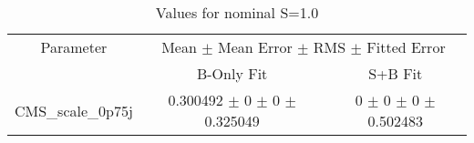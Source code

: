 \begin{table}
\centering
\caption{Values for nominal S=1.0}
\begin{tabular}{ccc}
\toprule
Parameter 	& \multicolumn{2}{c}{Mean $\pm$ Mean Error $\pm$ RMS $\pm$ Fitted Error}\\
 	& B-Only Fit & S+B Fit\\
\midrule
CMS\_scale\_0p75j 	& \num{0.300492} $\pm$ \num{0} $\pm$ \num{0} $\pm$ \num{0.325049} 	& \num{0} $\pm$ \num{0} $\pm$ \num{0} $\pm$ \num{0.502483}\\
\bottomrule
\end{tabular}
\end{table}